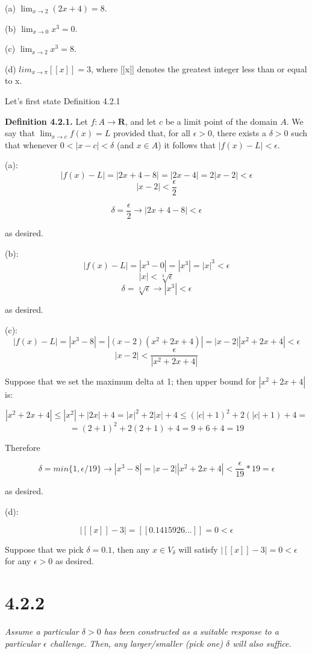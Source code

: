 \documentclass[11pt,oneside,titlepage]{book}
\begin{document}
(a) $\lim_{x \to 2}(2x + 4) = 8$.

(b) $\lim_{x\to0} x^3 = 0$.

(c) $\lim_{x\to2} x^3 = 8$.

(d) $lim_{x\to\pi}[[x]] = 3$, where [[x]] denotes the greatest integer less than or
equal to x.

Let's first state Definition 4.2.1

\textbf{Definition 4.2.1.} Let $f : A \to \textbf{R}$, and let $c$ be a limit
point of the domain $A$. We say that $\lim_{x\to c} f(x) = L$ provided
that, for all $\epsilon > 0$, there exists
a $\delta > 0$ such that whenever $0 < |x - c| < \delta$
(and $x \in A$) it follows that $|f(x) - L| < \epsilon$.

(a):
$$ |f(x) - L| = |2 x + 4 - 8| = |2 x - 4| = 2|x - 2| < \epsilon $$
$$ |x-2| < \frac{\epsilon}{2}$$

$$  \delta = \frac{\epsilon}{2} \to |2 x + 4 - 8| < \epsilon $$

as desired.

(b):
$$ |f(x) - L| = |x^3 - 0| = |x^3| = |x|^3 < \epsilon $$
$$ |x| < \sqrt[3]{\epsilon}{} $$
$$ \delta = \sqrt[3]{\epsilon} \to |x^3| < \epsilon $$

as desired.

(c):
$$ |f(x) - L| = |x^3 - 8| = |(x - 2)(x^2 + 2x + 4)| = |x-2||x^2 + 2x + 4| < \epsilon $$
$$|x-2| < \frac{\epsilon}{|x^2 + 2x + 4|} $$

Suppose that we set the maximum delta at 1; then upper bound for $|x^2 + 2x + 4|$ is:

$$ |x^2 + 2x + 4| \leq |x^2| + |2x| + 4 = |x|^2 + 2|x| + 4 \leq (|c| + 1)^2 + 2(|c| + 1) + 4 =$$
$$= (2 + 1)^2 + 2(2 + 1) + 4 = 9 + 6 + 4 = 19
$$

Therefore

$$\delta = min\{1, \epsilon/19\} \to |x^3 - 8| = |x-2||x^2 + 2x + 4| < \frac{\epsilon}{19} * 19 = \epsilon $$

as desired.

(d):

$$ |[[x]] - 3| = [[0.1415926...]] = 0 < \epsilon $$

Suppose that we pick $\delta = 0.1$, then any $x \in V_{\delta}$ will satisfy $|[[x]] - 3| = 0 < \epsilon $
for any $\epsilon > 0$ as desired.

\section*{4.2.2}
\textit{Assume a particular $\delta > 0$ has been constructed as a suitable response
  to a particular $\epsilon$ challenge. Then, any larger/smaller (pick one) $\delta$ will also suffice.}
\end{document}

